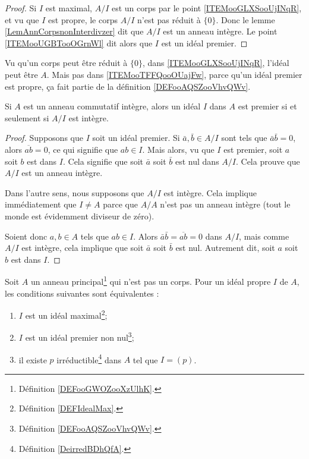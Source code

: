 \begin{proof}
    Si \( I\) est maximal, \( A/I\) est un corps par le point \ref{ITEMooGLXSooUjINqR}, et vu que \( I\) est propre, le corps \( A/I\) n'est pas réduit à \( \{ 0 \}\). Donc le lemme \ref{LemAnnCorpsnonInterdivzer} dit que \( A/I\) est un anneau intègre. Le point \ref{ITEMooUGBTooOGrnWl} dit alors que \( I\) est un idéal premier.
\end{proof}

\begin{remark}
    Vu qu'un corps peut être réduit à \( \{0\}\), dans \ref{ITEMooGLXSooUjINqR}, l'idéal peut être \( A\). Mais pas dans \ref{ITEMooTFFQooOUajFw}, parce qu'un idéal premier est propre, ça fait partie de la définition \ref{DEFooAQSZooVhvQWv}.
\end{remark}

\begin{proposition}     \label{PROPooHABIooBZZQMj}
    Si \( A\) est un anneau commutatif intègre, alors un idéal \( I\) dans \( A\) est premier si et seulement si \( A/I\) est intègre.
\end{proposition}

\begin{proof}
    Supposons que \( I\) soit un idéal premier. Si \( \bar a,\bar b\in A/I\)  sont tels que \( \bar a\bar b=0\), alors \( \overline{ ab }=0\), ce qui signifie que \( ab\in I\). Mais alors, vu que \( I\) est premier, soit \( a\) soit \( b\) est dans \( I\). Cela signifie que soit \( \bar a\) soit \( \bar b\) est nul dans \( A/I\). Cela prouve que \( A/I\) est un anneau intègre.

    Dans l'autre sens, nous supposons que \( A/I\) est intègre. Cela implique immédiatement que \( I\neq A\) parce que \( A/A\) n'est pas un anneau intègre (tout le monde est évidemment diviseur de zéro).

    Soient donc \( a,b\in A\) tels que \( ab\in I\). Alors \( \bar a\bar b= \overline{ ab }=0\) dans \( A/I\), mais comme \( A/I\) est intègre, cela implique que soit \( \bar a\) soit \( \bar b\) est nul. Autrement dit, soit \( a\) soit \( b\) est dans \( I\).
\end{proof}

\begin{proposition} \label{PropomqcGe}
    Soit \( A\) un anneau principal\footnote{Définition \ref{DEFooGWOZooXzUlhK}.} qui n'est pas un corps. Pour un idéal propre \( I\) de \( A\), les conditions suivantes sont équivalentes :
    \begin{enumerate}
        \item       \label{ITEMooNOVFooEHtcwE}
            \( I\) est un idéal maximal\footnote{Définition \ref{DEFIdealMax}.};
        \item       \label{ITEMooMQWVooNocVEU}
            \( I\) est un idéal premier non nul\footnote{Définition \ref{DEFooAQSZooVhvQWv}.};
        \item       \label{ITEMooJBXGooEISNuW}
            il existe \( p\) irréductible\footnote{Définition \ref{DeirredBDhQfA}.} dans \( A\) tel que \( I=(p)\).
    \end{enumerate}
\end{proposition}


